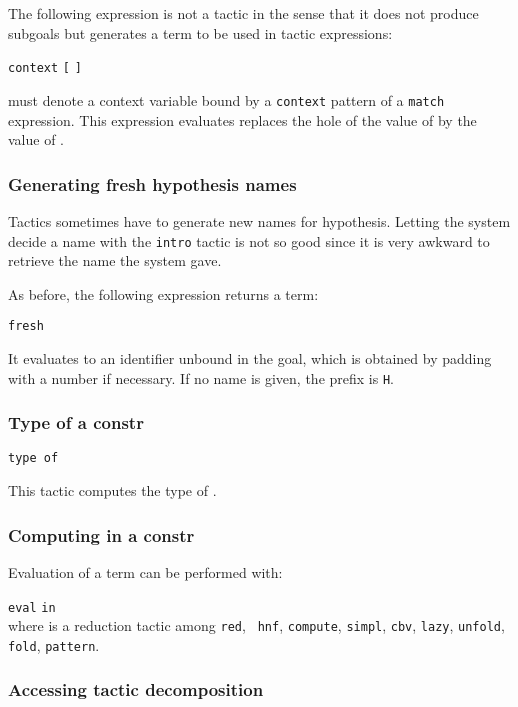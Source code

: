 The following expression is not a tactic in the sense that it does not
produce subgoals but generates a term to be used in tactic
expressions:

{\tt context} {\ident} {\tt [} {\tacexpr} {\tt ]}

{\ident} must denote a context variable bound by a {\tt context}
pattern of a {\tt match} expression. This expression evaluates
replaces the hole of the value of {\ident} by the value of
{\tacexpr}.

\ErrMsg {}

\subsubsection{Generating fresh hypothesis names}

Tactics sometimes have to generate new names for hypothesis. Letting
the system decide a name with the {\tt intro} tactic is not so good
since it is very awkward to retrieve the name the system gave.

As before, the following expression returns a term:

{\tt fresh} {\qstring}

It evaluates to an identifier unbound in the goal, which is obtained
by padding {\qstring} with a number if necessary. If no name is given,
the prefix is {\tt H}.

\subsubsection{Type of a constr}

{\tt type of} {\term}

This tactic computes the type of {\term}.


\subsubsection{Computing in a constr}

Evaluation of a term can be performed with:

{\tt eval} {} {\tt in} {\term}\\

where  is a reduction tactic among {\tt red}, {\tt
hnf}, {\tt compute}, {\tt simpl}, {\tt cbv}, {\tt lazy}, {\tt unfold},
{\tt fold}, {\tt pattern}.


\subsubsection{Accessing tactic decomposition}


